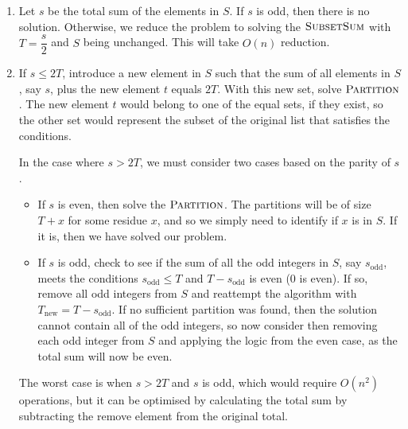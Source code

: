 \documentclass{article}
\begin{document}
\begin{solution}
\begin{enumerate}[label = (\alph*)]
    \item Let $s$ be the total sum of the elements in $S$. If $s$ is odd, then there is no solution. Otherwise, we reduce the problem to solving the $\mathsf{\textsc{SubsetSum}}$ with $T = \dfrac{s}{2}$ and $S$ being unchanged. This will take $O(n)$ reduction.

\item If $s \leq 2T$, introduce a new element in $S$ such that the sum of all elements in $S$, say $s$, plus the new element $t$ equals $2T$. With this new set, solve  $\mathsf{\textsc{Partition}}$. The new element $t$ would belong to one of the equal sets, if they exist, so the other set would represent the subset of the original list that satisfies the conditions.

In the case where $s > 2T$, we must consider two cases based on the parity of $s$.
\begin{itemize}
	\item If $s$ is even, then solve the  $\mathsf{\textsc{Partition}}$. The partitions will be of size $T + x$ for some residue $x$, and so we simply need to identify if $x$ is in $S$. If it is, then we have solved our problem.
	\item If $s$ is odd, check to see if the sum of all the odd integers in $S$, say $s_\text{odd}$, meets the conditions $s_\text{odd} \leq T$ and $T - s_\text{odd}$ is even ($0$ is even). If so, remove all odd integers from $S$ and reattempt the algorithm with $T_\text{new} = T - s_\text{odd}$. If no sufficient partition was found, then the solution cannot contain all of the odd integers, so now consider then removing each odd integer from $S$ and applying the logic from the even case, as the total sum will now be even. 
\end{itemize}

The worst case is when $s > 2T$ and $s$ is odd, which would require $O(n^2)$ operations, but it can be optimised by calculating the total sum by subtracting the remove element from the original total.
\end{enumerate}
\end{solution}
\end{document}
